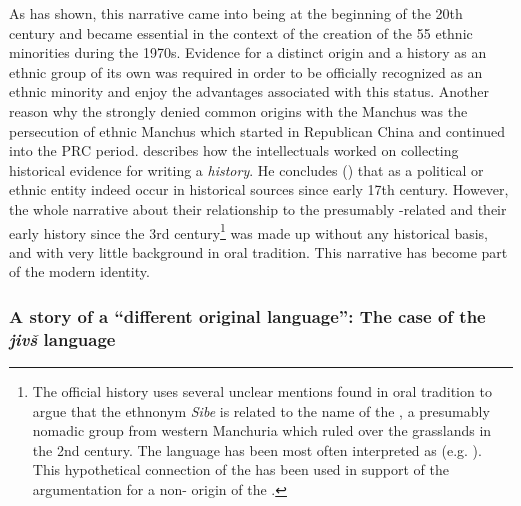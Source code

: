 \documentclass[output=paper,colorlinks,citecolor=brown]{langscibook}
\begin{document}
As \citet[58--70]{Zhuangsheng2019} has shown, this narrative came into being at the beginning of the 20th century and became essential in the context of the creation of the 55 ethnic minorities during the 1970s. Evidence for a distinct origin and a history as an ethnic group of its own was required in order to be officially recognized as an ethnic minority and enjoy the advantages associated with this status. Another reason why the  strongly denied common origins with the Manchus was the persecution of ethnic Manchus which started in Republican China and continued into the PRC period. \citet[58--71]{Zhuangsheng2019} describes how the  intellectuals worked on collecting historical evidence for writing a \textit{ history}. He concludes (\citeyear[71--72]{Zhuangsheng2019}) that  as a political or ethnic entity indeed occur in historical sources since early 17th century. However, the whole narrative about their relationship to the presumably -related  and their early history since the 3rd century\footnote{The official  history uses several unclear mentions found in oral tradition to argue that the ethnonym \textit{Sibe} is related to the name of the , a presumably nomadic group from western Manchuria which ruled over the  grasslands in the 2nd century. The  language has been most often interpreted as  (e.g. \citealt[281]{Janhunen2010}). This hypothetical  connection of the  has been used in support of the argumentation for a non- origin of the .} was made up without any historical basis, and with very little background in oral tradition. This narrative has become part of the modern  identity.

\subsubsection{A story of a “different original language”: The case of the \textit{jivš} language}\largerpage[2]
\end{document}
